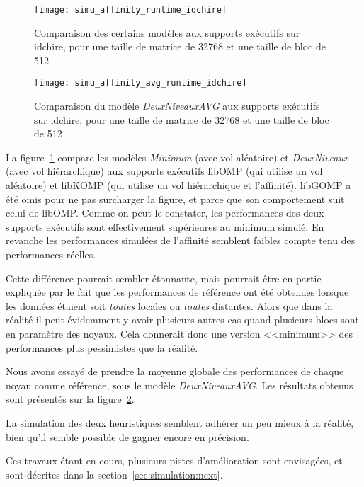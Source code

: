 \begin{figure}[t!]
  \centering
  \texttt{[image: simu\_affinity\_runtime\_idchire]}
  \caption{Comparaison des certains modèles aux supports exécutifs sur idchire, pour une taille de matrice de 32768 et une taille de bloc de 512}\label{fig:simu:modeles-vs-runtime:idchire}
\end{figure}
\begin{figure}[h!]
  \centering
  \texttt{[image: simu\_affinity\_avg\_runtime\_idchire]}
  \caption{Comparaison du modèle \emph{DeuxNiveauxAVG} aux supports exécutifs sur idchire, pour une taille de matrice de 32768 et une taille de bloc de 512}\label{fig:simu:affinityavg-vs-runtime:idchire}
\end{figure}


La figure~\ref{fig:simu:modeles-vs-runtime:idchire} compare les modèles \emph{Minimum} (avec vol aléatoire) et \emph{DeuxNiveaux} (avec vol hiérarchique) aux supports exécutifs libOMP (qui utilise un vol aléatoire) et libKOMP (qui utilise un vol hiérarchique et l'affinité). libGOMP a été omis pour ne pas surcharger la figure, et parce que son comportement suit celui de libOMP.
Comme on peut le constater, les performances des deux supports exécutifs sont effectivement supérieures au minimum simulé. En revanche les performances simulées de l'affinité semblent faibles compte tenu des performances réelles.

Cette différence pourrait sembler étonnante, mais pourrait être en partie expliquée par le fait que les performances de référence ont été obtenues lorsque les données étaient soit \textit{toutes} locales ou \textit{toutes} distantes.
Alors que dans la réalité il peut évidemment y avoir plusieurs autres cas quand plusieurs blocs sont en paramètre des noyaux.
Cela donnerait donc une version <<minimum>> des performances plus pessimistes que la réalité.

Nous avons essayé de prendre la moyenne globale des performances de chaque noyau comme référence, sous le modèle \emph{DeuxNiveauxAVG}.
Les résultats obtenus sont présentés sur la figure~\ref{fig:simu:affinityavg-vs-runtime:idchire}.

La simulation des deux heuristiques semblent adhérer un peu mieux à la réalité, bien qu'il semble possible de gagner encore en précision.

Ces travaux étant en cours, plusieurs pistes d'amélioration sont envisagées, et sont décrites dans la section~\ref{sec:simulation:next}.


